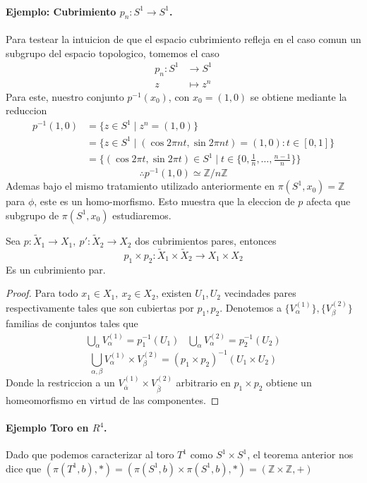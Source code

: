\paragraph{Ejemplo: Cubrimiento \(p_n : S^1 \to S^1\).} Para testear la intuicion
de que el espacio cubrimiento refleja en el caso comun un subgrupo del
espacio topologico, tomemos el caso
\begin{align*}
  p_n : S^1 &\longrightarrow S^1 \\
  z &\longmapsto z^n
\end{align*}
Para este, nuestro conjunto \(p^{-1} (x_0)\), con \(x_0 = (1,0)\) se
obtiene mediante la reduccion
\begin{align*}
  p^{-1} (1,0)
    &= \{ z \in S^1 \mid z^n = (1,0)\} \\
    &= \{z \in S^1 \mid (\cos 2 \pi n t, \sin 2 \pi n t) = (1,0) :
           t \in [0,1] \} \\
    &= \{(\cos 2 \pi t, \sin 2 \pi t) \in S^1 \mid
           t \in \{0, \frac 1 n , \dotsc , \frac {n-1} n \} \}
\end{align*}
\[ \therefore p^{-1}(1,0) \simeq \mathbb Z / n \mathbb Z \]
Ademas bajo el mismo tratamiento utilizado anteriormente en \(\pi (S^1,
x_0) = \mathbb Z\) para \(\phi\), este es un homo-morfismo. Esto muestra
que la eleccion de \(p\) afecta que subgrupo de \(\pi (S^1, x_0)\) estudiaremos.
\begin{teorema}
  Sea \(p : \tilde X _1 \to X_1,\ p' : \tilde X _2 \to X_2 \) dos
  cubrimientos pares, entonces
  \[ p_1 \times p_2 : \tilde X _1 \times \tilde X _2 \to X_1 \times X_2 \]
  Es un cubrimiento par.
\end{teorema}
\begin{proof}
  Para todo \(x_1 \in X_1,\ x_2 \in X_2\), existen \(U_1, U_2\)
  vecindades pares respectivamente tales que son cubiertas por \(p_1,
  p_2\). Denotemos a \(\{V_\alpha^{(1)}\}, \{V_\beta^{(2)}\}\) familias
  de conjuntos tales que
  \[
    \begin{matrix}
      \bigcup_{\alpha} V_\alpha^{(1)} = p_1^{-1} (U_1) &
      \bigcup_{\alpha} V_\alpha^{(2)} = p_2^{-1} (U_2)
    \end{matrix}
  \]
  \[ \bigcup_{\alpha, \beta} V_\alpha^{(1)} \times V_\beta^{(2)} = (p_1
    \times p_2)^{-1} (U_1 \times U_2)\]
  Donde la restriccion a un \(V_{\bar{\alpha}}^{(1)} \times
  V_{\bar{\beta}}^{(2)}\) arbitrario en \(p_1 \times p_2\) obtiene un
  homeomorfismo en virtud de las componentes.
\end{proof}

\paragraph{Ejemplo Toro en \(R^4\).} Dado que podemos caracterizar al
toro \(T^1\) como \(S^1 \times S^1\), el teorema anterior nos dice que
\((\pi (T^1, b), *) = (\pi (S^1, b) \times \pi (S^1, b), *) = (\mathbb Z
\times \mathbb Z, +) \)
